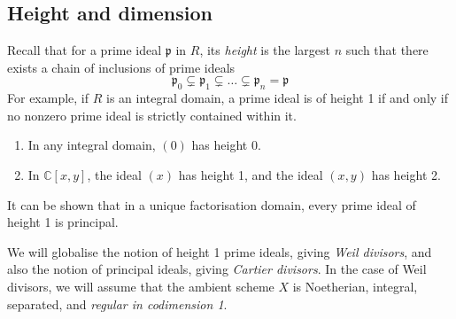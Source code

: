 \subsection{Height and dimension}
Recall that for a prime ideal \( \mathfrak p \) in \( R \), its \emph{height} is the largest \( n \) such that there exists a chain of inclusions of prime ideals
\[ \mathfrak p_0 \subsetneq \mathfrak p_1 \subsetneq \dots \subsetneq \mathfrak p_n = \mathfrak p \]
For example, if \( R \) is an integral domain, a prime ideal is of height 1 if and only if no nonzero prime ideal is strictly contained within it.
\begin{example}
    \begin{enumerate}
        \item In any integral domain, \( (0) \) has height 0.
        \item In \( \mathbb C[x, y] \), the ideal \( (x) \) has height 1, and the ideal \( (x, y) \) has height 2.
    \end{enumerate}
\end{example}
It can be shown that in a unique factorisation domain, every prime ideal of height 1 is principal.

We will globalise the notion of height 1 prime ideals, giving \emph{Weil divisors}, and also the notion of principal ideals, giving \emph{Cartier divisors}.
In the case of Weil divisors, we will assume that the ambient scheme \( X \) is Noetherian, integral, separated, and \emph{regular in codimension 1}.

